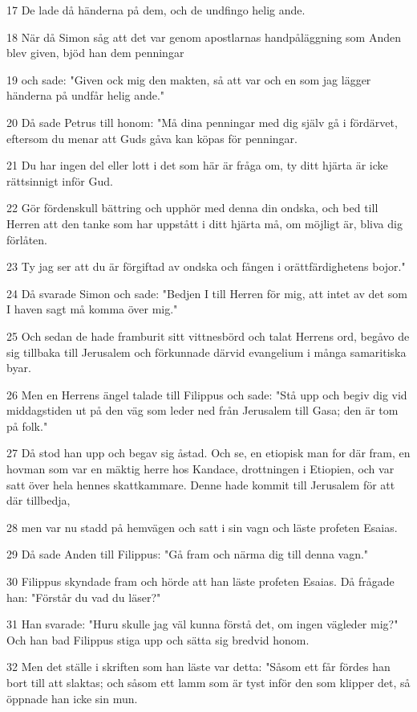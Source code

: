 \par 17 De lade då händerna på dem, och de undfingo helig ande.
\par 18 När då Simon såg att det var genom apostlarnas handpåläggning som Anden blev given, bjöd han dem penningar
\par 19 och sade: "Given ock mig den makten, så att var och en som jag lägger händerna på undfår helig ande."
\par 20 Då sade Petrus till honom: "Må dina penningar med dig själv gå i fördärvet, eftersom du menar att Guds gåva kan köpas för penningar.
\par 21 Du har ingen del eller lott i det som här är fråga om, ty ditt hjärta är icke rättsinnigt inför Gud.
\par 22 Gör fördenskull bättring och upphör med denna din ondska, och bed till Herren att den tanke som har uppstått i ditt hjärta må, om möjligt är, bliva dig förlåten.
\par 23 Ty jag ser att du är förgiftad av ondska och fången i orättfärdighetens bojor."
\par 24 Då svarade Simon och sade: "Bedjen I till Herren för mig, att intet av det som I haven sagt må komma över mig."
\par 25 Och sedan de hade framburit sitt vittnesbörd och talat Herrens ord, begåvo de sig tillbaka till Jerusalem och förkunnade därvid evangelium i många samaritiska byar.
\par 26 Men en Herrens ängel talade till Filippus och sade: "Stå upp och begiv dig vid middagstiden ut på den väg som leder ned från Jerusalem till Gasa; den är tom på folk."
\par 27 Då stod han upp och begav sig åstad. Och se, en etiopisk man for där fram, en hovman som var en mäktig herre hos Kandace, drottningen i Etiopien, och var satt över hela hennes skattkammare. Denne hade kommit till Jerusalem för att där tillbedja,
\par 28 men var nu stadd på hemvägen och satt i sin vagn och läste profeten Esaias.
\par 29 Då sade Anden till Filippus: "Gå fram och närma dig till denna vagn."
\par 30 Filippus skyndade fram och hörde att han läste profeten Esaias. Då frågade han: "Förstår du vad du läser?"
\par 31 Han svarade: "Huru skulle jag väl kunna förstå det, om ingen vägleder mig?" Och han bad Filippus stiga upp och sätta sig bredvid honom.
\par 32 Men det ställe i skriften som han läste var detta: "Såsom ett får fördes han bort till att slaktas; och såsom ett lamm som är tyst inför den som klipper det, så öppnade han icke sin mun.

